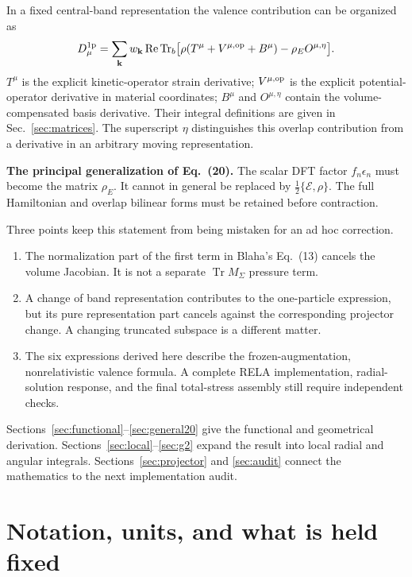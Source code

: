 \documentclass[11pt]{article}
\newcommand{\Tr}{\operatorname{Tr}}
\newcommand{\Rea}{\operatorname{Re}}
\newcommand{\kb}{\mathbf k}
\newcommand{\Es}{\mathcal E}
\newcommand{\rE}{{\rho_E}}
\newcommand{\note}[2]{\par\medskip\noindent\colorbox{#1}{\parbox{\dimexpr\linewidth-2\fboxsep\relax}{#2}}\par\medskip}
\newcommand{\key}[1]{\note{pale}{#1}}
\newcommand{\newpart}[1]{\par\Needspace{12\baselineskip}\section{#1}}
\begin{document}
In a fixed central-band representation the valence contribution can be
organized as
\begin{equation}
 D_\mu^{\rm 1p}=\sum_\kb w_\kb\Rea\Tr_b
 \bigl[\rho(T^\mu+V^{\mu,\rm op}+B^\mu)
             -\rE O^{\mu,\eta}\bigr].
 \label{eq:overview}
\end{equation}
$T^\mu$ is the explicit kinetic-operator strain derivative;
$V^{\mu,\rm op}$ is the explicit potential-operator derivative in material
coordinates; $B^\mu$ and $O^{\mu,\eta}$ contain the volume-compensated
basis derivative. Their integral definitions are given in
Sec.~\ref{sec:matrices}. The superscript $\eta$ distinguishes this overlap
contribution from a derivative in an arbitrary moving representation.

\key{\textbf{The principal generalization of Eq.\ (20).}
The scalar DFT factor $f_n\epsilon_n$ must become the matrix $\rho_E$.
It cannot in general be replaced by $\tfrac12\{\Es,\rho\}$.
The full Hamiltonian and overlap bilinear forms must be retained before
contraction.}

Three points keep this statement from being mistaken for an ad hoc correction.
\begin{enumerate}
\item The normalization part of the first term in Blaha's Eq.\ (13)
      cancels the volume Jacobian. It is not a separate $\Tr M_\Sigma$
      pressure term.
\item A change of band representation contributes to the one-particle
      expression, but its pure representation part cancels against the
      corresponding projector change. A changing truncated subspace is
      a different matter.
\item The six expressions derived here describe the frozen-augmentation,
      nonrelativistic valence formula. A complete RELA implementation,
      radial-solution response, and the final total-stress assembly still
      require independent checks.
\end{enumerate}

Sections~\ref{sec:functional}--\ref{sec:general20} give the functional and
geometrical derivation. Sections~\ref{sec:local}--\ref{sec:g2} expand the result
into local radial and angular integrals. Sections~\ref{sec:projector} and
\ref{sec:audit} connect the mathematics to the next implementation audit.

\newpart{Notation, units, and what is held fixed}
\label{sec:notation}
\end{document}
